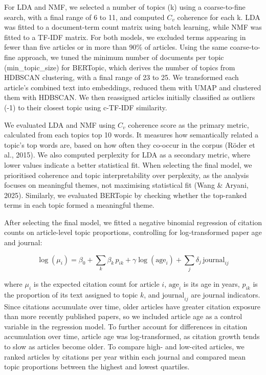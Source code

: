 \documentclass[11pt,a4paper]{article}
\begin{document}
For LDA and NMF, we selected a number of topics (k) using a coarse-to-fine search, with a final range of 6 to 11, and computed \(C_{v}\) coherence for each k. LDA was fitted to a document-term count matrix using batch learning, while NMF was fitted to a TF-IDF matrix. For both models, we excluded terms appearing in fewer than five articles or in more than 90\% of articles. Using the same coarse-to-fine approach, we tuned the minimum number of documents per topic (min\_topic\_size) for BERTopic, which derives the number of topics from HDBSCAN clustering, with a final range of 23 to 25. We transformed each article's combined text into embeddings, reduced them with UMAP and clustered them with HDBSCAN. We then reassigned articles initially classified as outliers (-1) to their closest topic using c-TF-IDF similarity.

We evaluated LDA and NMF using \(C_{v}\) coherence score as the primary metric, calculated from each topic\textquotesingle s top 10 words. It measures how semantically related a topic's top words are, based on how often they co-occur in the corpus (Röder et al., 2015). We also computed perplexity for LDA as a secondary metric, where lower values indicate a better statistical fit. When selecting the final model, we prioritised coherence and topic interpretability over perplexity, as the analysis focuses on meaningful themes, not maximising statistical fit (Wang \& Aryani, 2025). Similarly, we evaluated BERTopic by checking whether the top-ranked terms in each topic formed a meaningful theme.

After selecting the final model, we fitted a negative binomial regression of citation counts on article-level topic proportions, controlling for log-transformed paper age and journal:

\[\log(\mu_i) = \beta_0 + \sum_k \beta_k\, p_{ik} + \gamma \log(\text{age}_i) + \sum_j \delta_j\, \text{journal}_{ij}\]

where \(\mu_i\) is the expected citation count for article \(i\), \(\text{age}_i\) is its age in years, \(p_{ik}\) is the proportion of its text assigned to topic \(k\), and \(\text{journal}_{ij}\) are journal indicators. Since citations accumulate over time, older articles have greater citation exposure than more recently published papers, so we included article age as a control variable in the regression model. To further account for differences in citation accumulation over time, article age was log-transformed, as citation growth tends to slow as articles become older. To compare high- and low-cited articles, we ranked articles by citations per year within each journal and compared mean topic proportions between the highest and lowest quartiles.
\end{document}
